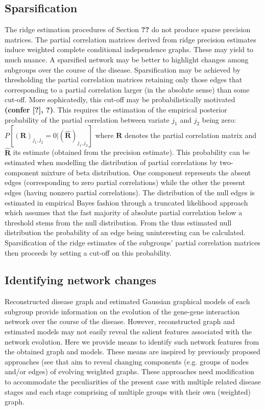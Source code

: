\documentclass[10pt]{article}
\newcommand{\red}[1]{{\textcolor {red} {#1}}}
\begin{document}
\subsection{Sparsification}\label{sparsify}
The ridge estimation procedures of Section \textbf{??} do not produce sparse precision matrices. The partial correlation matrices derived from ridge precision estimates induce weighted complete conditional independence graphs. These may yield to much nuance. A sparsified network may be better to highlight changes among subgroups over the course of the disease. Sparsification may be achieved by thresholding the partial correlation matrices retaining only those edges that corresponding to a partial correlation larger (in the absolute sense) than some cut-off. More sophicatedly, this cut-off may be probabilistically motivated \textbf{(confer [?], ?)}. This requires the estimation of the empirical posterior probability of the partial correlation between variate $j_1$ and $j_2$ being zero: $P[(\mathbf{R})_{j_1,j_2} = 0| (\widehat{\mathbf{R}})_{j_1,j_2} ]$ where $\mathbf{R}$ denotes the partial correlation matrix and $\widehat{\mathbf{R}}$ its estimate (obtained from the precision estimate). This probability can be estimated when modelling the distribution of partial correlations by two-component mixture of beta distribution. One component represents the absent edges (corresponding to zero partial correlations) while the other the present edges (having nonzero partial correlations). The distribution of the null edges is estimated in empirical Bayes fashion through a truncated likelihood approach which assumes that the fast majority of absolute partial correlation below a threshold stems from the null distribution. From the thus estimated null distribution the
probability of an edge being uninteresting can be calculated. Sparsification of the ridge estimates of the subgroups' partial correlation matrices then proceeds by setting a cut-off on this probability.


\subsection{Identifying network changes} \label{topology}
Reconstructed disease graph and estimated Gaussian graphical models of each subgroup provide information on the evolution of the gene-gene interaction network over the course of the disease. However, reconstructed graph and estimated models may not easily reveal the salient features associated with the network evolution. Here we provide means to identify such network features from the obtained graph and models. These means are inspired by previously proposed approaches (see \citet{bunke2006,muthukrishnan2010edge,berlingerio2009mining,akoglu2010oddball,liu2008spotting,aggarwal2014evolutionary,sricharan2014}%
that aim to reveal changing components (e.g. groups of nodes and/or edges) of evolving weighted graphs. These approaches need modification to accommodate the peculiarities of the present case with multiple related disease stages and each stage comprising of multiple groups with their own (weighted) graph.
\end{document}
